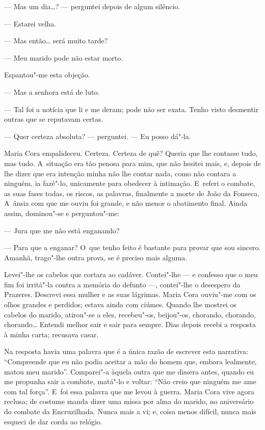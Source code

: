 \begin{linenumbers}
--- Mas um dia\ldots{}? --- perguntei depois de algum silêncio.

--- Estarei velha.

--- Mas então\ldots{} será muito tarde?

--- Meu marido pode não estar morto.

Espantou"-me esta objeção.

--- Mas a senhora está de luto.

--- Tal foi a notícia que li e me deram; pode não ser exata. Tenho visto
desmentir outras que se reputavam certas.

--- Quer certeza absoluta? --- perguntei. --- Eu posso dá"-la.

Maria Cora empalideceu. Certeza. Certeza de quê? Queria que lhe contasse
tudo, mas tudo. A~situação era tão penosa para mim, que não hesitei
mais, e, depois de lhe dizer que era intenção minha não lhe contar nada,
como não contara a ninguém, ia fazê"-lo, unicamente para obedecer à
intimação. E~referi o combate, as suas fases todas, os riscos, as
palavras, finalmente a morte de João da Fonseca. A~ânsia com que me
ouviu foi grande, e não menor o abatimento final. Ainda assim,
dominou"-se e perguntou"-me:

--- Jura que me não está enganando?

--- Para que a enganar? O~que tenho feito é bastante para provar que sou
sincero. Amanhã, trago"-lhe outra prova, se é preciso mais alguma.

Levei"-lhe os cabelos que cortara ao cadáver. Contei"-lhe --- e confesso
que o meu fim foi irritá"-la contra a memória do defunto ---, contei"-lhe o
desespero da Prazeres. Descrevi essa mulher e as suas lágrimas. Maria
Cora ouviu"-me com os olhos grandes e perdidos; estava ainda com ciúmes.
Quando lhe mostrei os cabelos do marido, atirou"-se a eles, recebeu"-os,
beijou"-os, chorando, chorando, chorando\ldots{} Entendi melhor sair e sair
para sempre. Dias depois recebi a resposta à minha carta; recusava
casar.

Na resposta havia uma palavra que é a única razão de escrever esta
narrativa: ``Compreende que eu não podia aceitar a mão do homem que,
embora lealmente, matou meu marido''. Comparei"-a àquela outra que me
dissera antes, quando eu me propunha sair a combate, matá"-lo e voltar:
``Não creio que ninguém me ame com tal força''. E~foi essa palavra que
me levou à guerra. Maria Cora vive agora reclusa; de costume manda dizer
uma missa por alma do marido, no aniversário do combate da Encruzilhada.
Nunca mais a vi; e, coisa menos difícil, nunca mais esqueci de dar corda
ao relógio.

\end{linenumbers}


